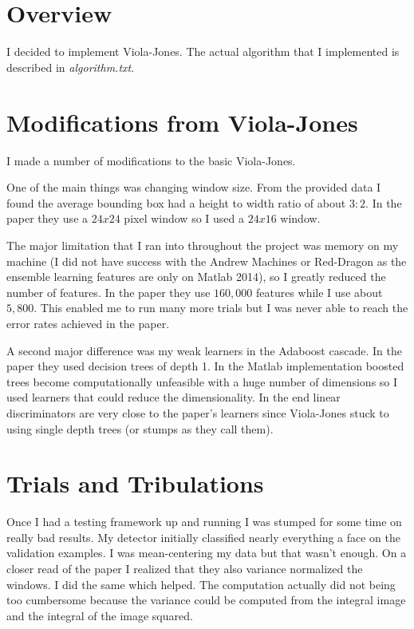\documentclass[letterpaper,12pt]{article}
\title{\className \\ \assignmentName}
\author{\myName}
\date{\dueDate}
\begin{document}
\maketitle

\section{Overview}
I decided to implement Viola-Jones. The actual algorithm that I implemented is described in \textit{algorithm.txt}.

\section{Modifications from Viola-Jones}
I made a number of modifications to the basic Viola-Jones.

One of the main things was changing window size. From the provided data I found the average bounding box had a height to width ratio of about $3:2$. In the paper they use a $24x24$ pixel window so I used a $24x16$ window.

The major limitation that I ran into throughout the project was memory on my machine (I did not have success with the Andrew Machines or Red-Dragon as the ensemble learning features are only on Matlab 2014), so I greatly reduced the number of features. In the paper they use $160,000$ features while I use about $5,800$. This enabled me to run many more trials but I was never able to reach the error rates achieved in the paper.

A second major difference was my weak learners in the Adaboost cascade. In the paper they used decision trees of depth 1. In the Matlab implementation boosted trees become computationally unfeasible with a huge number of dimensions so I used learners that could reduce the dimensionality. In the end linear discriminators are very close to the paper's learners since Viola-Jones stuck to using single depth trees (or stumps as they call them).

\section{Trials and Tribulations}
Once I had a testing framework up and running I was stumped for some time on really bad results. My detector initially classified nearly everything a face on the validation examples. I was mean-centering my data but that wasn't enough. On a closer read of the paper I realized that they also variance normalized the windows. I did the same which helped. The computation actually did not being too cumbersome because the variance could be computed from the integral image and the integral of the image squared.
\end{document}
